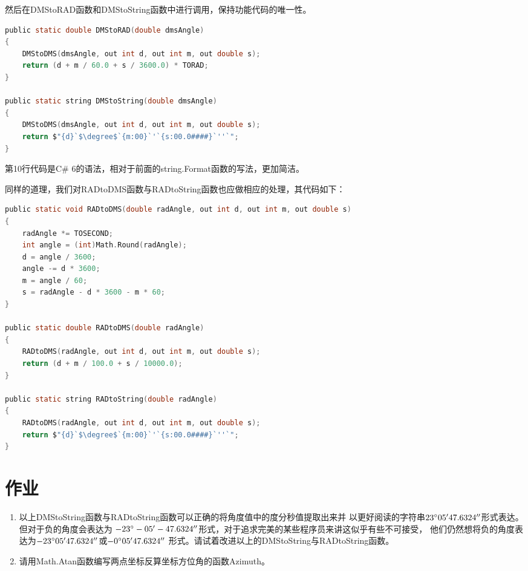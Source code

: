 然后在DMStoRAD函数和DMStoString函数中进行调用，保持功能代码的唯一性。

\begin{lstlisting}[language=C]
public static double DMStoRAD(double dmsAngle)
{
    DMStoDMS(dmsAngle, out int d, out int m, out double s);
    return (d + m / 60.0 + s / 3600.0) * TORAD;
}

public static string DMStoString(double dmsAngle)
{
    DMStoDMS(dmsAngle, out int d, out int m, out double s);
    return $"{d}`$\degree$`{m:00}`'`{s:00.0####}`''`";
}
\end{lstlisting}

第10行代码是C\# 6的语法，相对于前面的string.Format函数的写法，更加简洁。

同样的道理，我们对RADtoDMS函数与RADtoString函数也应做相应的处理，其代码如下：
\begin{lstlisting}[language=C]
public static void RADtoDMS(double radAngle, out int d, out int m, out double s)
{
    radAngle *= TOSECOND;
    int angle = (int)Math.Round(radAngle);
    d = angle / 3600;
    angle -= d * 3600;
    m = angle / 60;
    s = radAngle - d * 3600 - m * 60;
}

public static double RADtoDMS(double radAngle)
{
    RADtoDMS(radAngle, out int d, out int m, out double s);
    return (d + m / 100.0 + s / 10000.0);
}

public static string RADtoString(double radAngle)
{
    RADtoDMS(radAngle, out int d, out int m, out double s);
    return $"{d}`$\degree$`{m:00}`'`{s:00.0####}`''`";
}
\end{lstlisting}


\section*{作业}

\begin{enumerate}
\item 以上DMStoString函数与RADtoString函数可以正确的将角度值中的度分秒值提取出来并
以更好阅读的字符串$23^\circ 05'47.6324''$形式表达。但对于负的角度会表达为
$-23^\circ -05'-47.6324''$形式，对于追求完美的某些程序员来讲这似乎有些不可接受，
他们仍然想将负的角度表达为$-23^\circ 05'47.6324''$或$-0^\circ 05'47.6324''$
形式。请试着改进以上的DMStoString与RADtoString函数。
    
\item 请用Math.Atan函数编写两点坐标反算坐标方位角的函数Azimuth。
\end{enumerate}